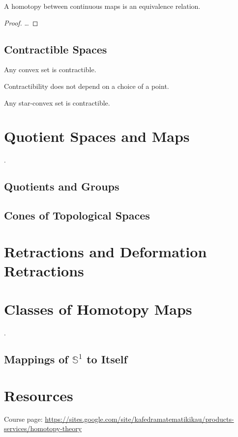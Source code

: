 \documentclass[10pt]{article}
\begin{document}
\begin{theorem}
  A homotopy between continuous maps is an equivalence relation.
\end{theorem}

\begin{proof}
  \ldots
\end{proof}

\subsection{Contractible Spaces}




\begin{theorem}
  Any convex set is contractible.
\end{theorem}

\begin{elemma}
  Contractibility does not depend on a choice of a point.
\end{elemma}


\begin{theorem}
  Any star-convex set is contractible.
\end{theorem}

\section{Quotient Spaces and Maps}


.


\subsection{Quotients and Groups}

\subsection{Cones of Topological Spaces}

\section{Retractions and Deformation Retractions}

\section{Classes of Homotopy Maps}

.

\subsection{Mappings of $\mathbb{S}^1$ to Itself}


\section{Resources}

Course page: \url{https://sites.google.com/site/kafedramatematikikau/products-services/homotopy-theory}

{}

\end{document}
